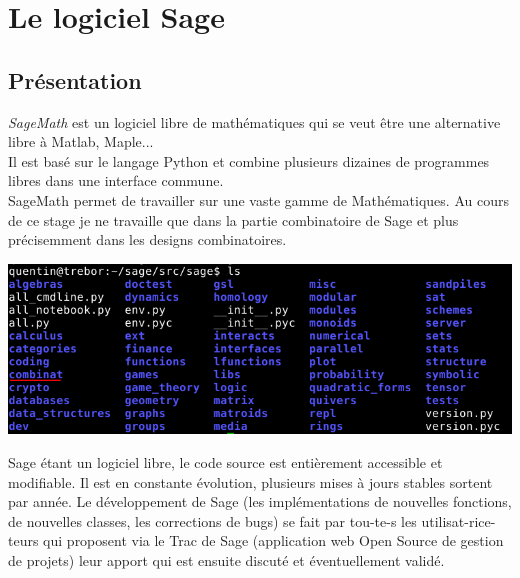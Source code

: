 \documentclass[a4paper]{article}
\begin{document}
\newpage

\section{Le logiciel Sage}
\subsection{Présentation}
\textit{SageMath} est un logiciel libre de mathématiques qui se veut être une alternative libre à Matlab, Maple...\vspace{1\baselineskip}\\

Il est basé sur le langage Python et combine plusieurs dizaines de programmes libres dans une interface commune.\\
SageMath permet de travailler sur une vaste gamme de Mathématiques. Au cours de ce stage je ne travaille que dans la partie combinatoire de Sage et plus précisemment dans les designs combinatoires.
\vspace{3\baselineskip}
\begin{center}
  \includegraphics[scale=0.6]{matieres.jpg}
\end{center}
\vspace{3\baselineskip}
Sage étant un logiciel libre, le code source est entièrement accessible et modifiable. Il est en constante évolution, plusieurs mises à jours stables sortent par année. Le développement de Sage (les implémentations de nouvelles fonctions, de nouvelles classes, les corrections de bugs) se fait par tou-te-s les utilisat-rice-teurs qui proposent via le Trac de Sage (application web Open Source de gestion de projets) leur apport qui est ensuite discuté et éventuellement validé.








\newpage
\end{document}

